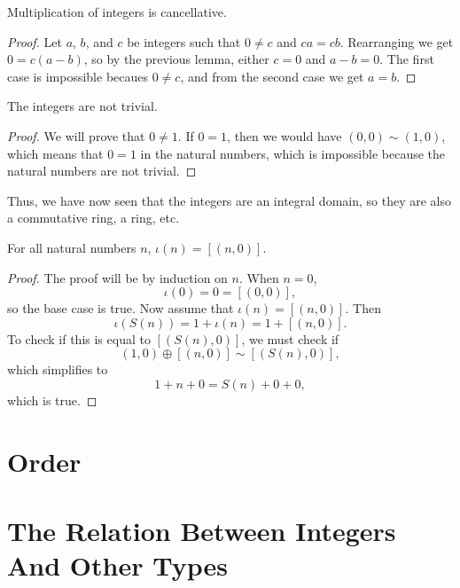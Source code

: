 \documentclass[../../math.tex]{subfiles}
\begin{document}
\begin{instance}
    Multiplication of integers is cancellative.
\end{instance}
\begin{proof}
    Let $a$, $b$, and $c$ be integers such that $0 \neq c$ and $ca = cb$.
    Rearranging we get $0 = c(a - b)$, so by the previous lemma, either $c = 0$
    and $a - b = 0$.  The first case is impossible becaues $0 \neq c$, and from
    the second case we get $a = b$.
\end{proof}

\begin{instance}
    The integers are not trivial.
\end{instance}
\begin{proof}
    We will prove that $0 \neq 1$.  If $0 = 1$, then we would have $(0, 0) \sim
    (1, 0)$, which means that $0 = 1$ in the natural numbers, which is
    impossible because the natural numbers are not trivial.
\end{proof}

Thus, we have now seen that the integers are an integral domain, so they are
also a commutative ring, a ring, etc.

\begin{theorem}
    For all natural numbers $n$, $\iota(n) = [(n, 0)]$.
\end{theorem}
\begin{proof}
    The proof will be by induction on $n$.  When $n = 0$,
    \[
        \iota(0) = 0 = [(0, 0)],
    \]
    so the base case is true.  Now assume that $\iota(n) = [(n, 0)]$.  Then
    \[
        \iota(S(n)) = 1 + \iota(n) = 1 + [(n, 0)].
    \]
    To check if this is equal to $[(S(n), 0)]$, we must check if
    \[
        (1, 0) \oplus [(n, 0)] \sim [(S(n), 0)],
    \]
    which simplifies to
    \[
        1 + n + 0 = S(n) + 0 + 0,
    \]
    which is true.
\end{proof}

\section{Order}

\section{The Relation Between Integers And Other Types}
\end{document}
